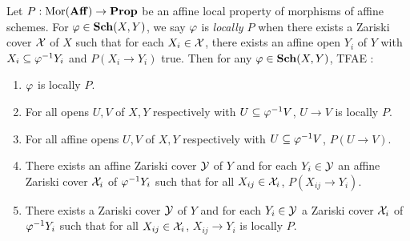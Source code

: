 \documentclass[../main.tex]{subfiles}
\begin{document}
\begin{prop}
  
  Let $P : \operatorname{Mor}(\mathbf{Aff}) \to \mathbf{Prop}$ be an affine local property 
  of morphisms of affine schemes.
  For $\varphi \in \mathbf{Sch}(X,Y)$,
  we say $\varphi$ is \emph{locally $P$} when 
  there exists a Zariski cover $\mathcal{X}$ of $X$ such that 
  for each $X_i \in \mathcal{X}$, 
  there exists an affine open $Y_i$ of $Y$ with 
  $X_i \subseteq \varphi^{-1} Y_i$ and $P(X_i \to Y_i)$ true. 
  Then for any $\varphi \in \mathbf{Sch}(X,Y)$, TFAE : 
  \begin{enumerate}
    \item $\varphi$ is locally $P$.
    \item For all opens $U, V$ of $X,Y$ respectively with $U \subseteq \varphi^{-1} V$,
    $U \to V$ is locally $P$.
    \item For all affine opens $U, V$ of $X,Y$ respectively with 
    $U \subseteq \varphi^{-1} V$, $P(U \to V)$.
    \item There exists an affine Zariski cover $\mathcal{Y}$ of $Y$ and 
    for each $Y_i \in \mathcal{Y}$ an affine Zariski cover $\mathcal{X}_i$ of $\varphi^{-1} Y_i$ 
    such that for all $X_{ij} \in \mathcal{X}_i$, $P(X_{ij} \to Y_i)$.
    \item There exists a Zariski cover $\mathcal{Y}$ of $Y$ and 
    for each $Y_i \in \mathcal{Y}$ a Zariski cover $\mathcal{X}_i$ of $\varphi^{-1} Y_i$ 
    such that for all $X_{ij} \in \mathcal{X}_i$, $X_{ij} \to Y_i$ is locally $P$.
  \end{enumerate}
\end{prop}
\end{document}
